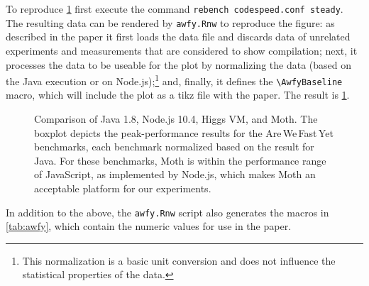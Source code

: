 \documentclass[a4paper,USenglish]{darts-v2019}
\def\AWFY{Are\,We\,Fast\,Yet\xspace}
\newcommand{\code}[1]{\texttt{#1}}
\begin{document}
To reproduce \cref{fig:awfy-baseline}
first execute the command \code{rebench codespeed.conf steady}.
The resulting data can be rendered by \code{awfy.Rnw} to reproduce the figure:
as described in the paper
it first loads the data file
and discards data of unrelated experiments
and measurements that are considered to show compilation;
next, it processes the data to be useable for the plot
by normalizing the data (based on the Java execution or on Node.js);\footnote{
This normalization is a basic unit conversion and does not influence the
statistical properties of the data.
}
and, finally, it defines the \code{\textbackslash{}AwfyBaseline} macro,
which will include the plot as a tikz file with the paper.
The result is \cref{fig:awfy-baseline}.

\begin{figure}[htb]
  \centering
	\AwfyBaseline{}
	\caption{Comparison of Java 1.8, Node.js 10.4, Higgs VM, and Moth.
  The boxplot depicts the peak-performance results for the \AWFY benchmarks,
  each benchmark normalized based on the result for Java.
  For these benchmarks, Moth is within the performance range
  of JavaScript, as implemented by Node.js,
  which makes Moth an acceptable platform for our experiments.}
	\label{fig:awfy-baseline}
\end{figure}

In addition to the above, the \code{awfy.Rnw} script also
generates the macros in \cref{tab:awfy},
which contain the numeric values for use in the paper.
\end{document}
